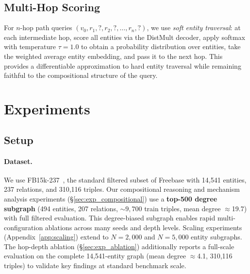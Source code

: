 \documentclass{article}
\begin{document}
\subsection{Multi-Hop Scoring}

For $n$-hop path queries $(v_0, r_1, ?, r_2, ?, \ldots, r_n, ?)$, we use \emph{soft entity traversal}: at each intermediate hop, score all entities via the DistMult decoder, apply softmax with temperature $\tau=1.0$ to obtain a probability distribution over entities, take the weighted average entity embedding, and pass it to the next hop. This provides a differentiable approximation to hard entity traversal while remaining faithful to the compositional structure of the query.

\section{Experiments}
\label{sec:experiments}

\subsection{Setup}
\label{sec:exp_setup}

\paragraph{Dataset.} We use FB15k-237~\cite{toutanova2015representing}, the standard filtered subset of Freebase with 14,541 entities, 237 relations, and 310,116 triples. Our compositional reasoning and mechanism analysis experiments (\S\ref{sec:exp_compositional}) use a \textbf{top-500 degree subgraph} (494 entities, 207 relations, ${\sim}9{,}700$ train triples, mean degree $\approx$19.7) with full filtered evaluation. This degree-biased subgraph enables rapid multi-configuration ablations across many seeds and depth levels. Scaling experiments (Appendix~\ref{app:scaling}) extend to $N{=}2{,}000$ and $N{=}5{,}000$ entity subgraphs. The hop-depth ablation (\S\ref{sec:exp_ablation}) additionally reports a full-scale evaluation on the complete 14,541-entity graph (mean degree $\approx$4.1, 310,116 triples) to validate key findings at standard benchmark scale.
\end{document}

